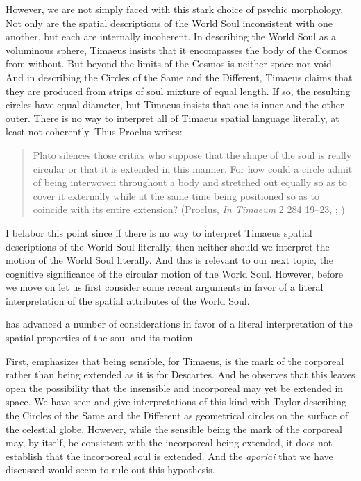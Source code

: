 However, we are not simply faced with this stark choice of psychic morphology. Not only are the spatial descriptions of the World Soul inconsistent with one another, but each are internally incoherent. In describing the World Soul as a voluminous sphere, Timaeus insists that it encompasses the body of the Cosmos from without. But beyond the limits of the Cosmos is neither space nor void. And in describing the Circles of the Same and the Different, Timaeus claims that they are produced from strips of soul mixture of equal length. If so, the resulting circles have equal diameter, but Timaeus insists that one is inner and the other outer. There is no way to interpret all of Timaeus spatial language literally, at least not coherently. Thus Proclus writes:
\begin{quote}
	Plato silences those critics who suppose that the shape of the soul is really circular or that it is extended in this manner. For how could a circle admit of being interwoven throughout a body and stretched out equally so as to cover it externally while at the same time being positioned so as to coincide with its entire extension? (Proclus, \emph{In Timaeum} 2 284 19--23, \citealt{Diehl:1903re}; \citealt[278]{Baltzly:2009bc})
\end{quote}

I belabor this point since if there is no way to interpret Timaeus spatial descriptions of the World Soul literally, then neither should we interpret the motion of the World Soul literally. And this is relevant to our next topic, the cognitive significance of the circular motion of the World Soul. However, before we move on let us first consider some recent arguments in favor of a literal interpretation of the spatial attributes of the World Soul.

\citet{Sedley:1997kr} has advanced a number of considerations in favor of a literal interpretation of the spatial properties of the soul and its motion.

First, \citet[329--30]{Sedley:1997kr} emphasizes that being sensible, for Timaeus, is the mark of the corporeal rather than being extended as it is for Descartes. And he observes that this leaves open the possibility that the insensible and incorporeal may yet be extended in space. We have seen \citet[111--2 n7]{Archer-Hind:1888qd} and \citet[148]{Taylor:1928qb} give interpretations of this kind with Taylor describing the Circles of the Same and the Different as geometrical circles on the surface of the celestial globe. However, while the sensible being the mark of the corporeal may, by itself, be consistent with the incorporeal being extended, it does not establish that the incorporeal soul is extended. And the \emph{aporiai} that we have discussed would seem to rule out this hypothesis.

